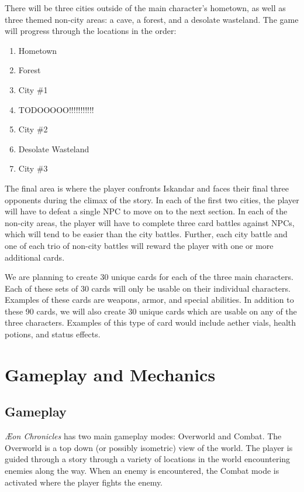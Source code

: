 \documentclass[12pt,titlepage]{article}
\newcommand\evilcorp{Iskandar\xspace}
\newcommand\gametitle{\textit{\AE on Chronicles}\xspace}
\begin{document}
There will be three cities outside of the main character's hometown, as well as
three themed non-city areas: a cave, a forest, and a desolate wasteland. The
game will progress through the locations in the order:

\begin{enumerate}
    \item Hometown
    \item Forest
    \item City \#1
    \item TODOOOOO!!!!!!!!!!!
    \item City \#2
    \item Desolate Wasteland
    \item City \#3
\end{enumerate}

The final area is where the player confronts \evilcorp and faces their final
three opponents during the climax of the story. In each of the first two cities,
the player will have to defeat a single NPC to move on to the next section. In
each of the non-city areas, the player will have to complete three card battles
against NPCs, which will tend to be easier than the city battles. Further, each
city battle and one of each trio of non-city battles will reward the player with
one or more additional cards.

We are planning to create 30 unique cards for each of the three main characters.
Each of these sets of 30 cards will only be usable on their individual
characters. Examples of these cards are weapons, armor, and special abilities.
In addition to these 90 cards, we will also create 30 unique cards which are
usable on any of the three characters. Examples of this type of card would
include aether vials, health potions, and status effects.

\newpage
\section{Gameplay and Mechanics}

\subsection{Gameplay}
\gametitle has two main gameplay modes: Overworld and Combat. The Overworld is a
top down (or possibly isometric) view of the world. The player is guided through
a story through a variety of locations in the world encountering enemies along
the way. When an enemy is encountered, the Combat mode is activated where the
player fights the enemy.
\end{document}
